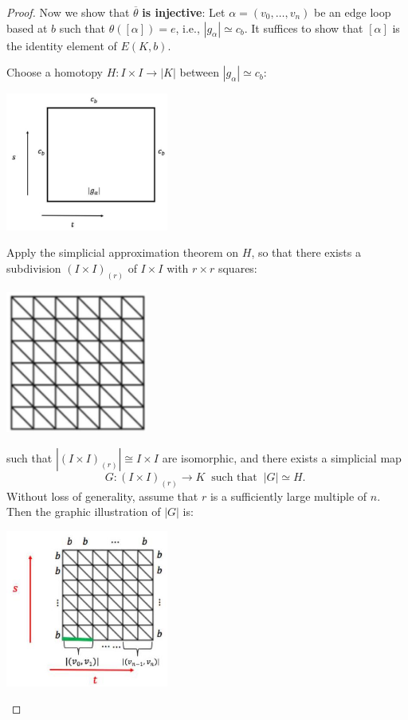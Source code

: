 \begin{proof}
Now we show that $\overline{\theta}$ {\bf is injective}: Let \(\alpha  = \left( {{v}_{0},\ldots,{v}_{n}}\right)\) be an edge loop based at \(b\) such that \(\theta \left( \left\lbrack  \alpha \right\rbrack  \right)  = e\), i.e., \(\left| {g}_{\alpha }\right|  \simeq  {c}_{b}\). It suffices to show that \(\left\lbrack  \alpha \right\rbrack\) is the identity element of \(E\left( {K,b}\right)\).

Choose a homotopy \(H: I \times  I \rightarrow  \left| K\right|\) 
between \(\left| {g}_{\alpha }\right|  \simeq  {c}_{b}\):
\begin{center}
\includegraphics[width=0.4\textwidth]{images/Ch8_g_alpha_cb.jpg}
\end{center}
\hspace*{3em} 
Apply the simplicial approximation theorem on $H$, so that there exists a subdivision \({\left( I \times  I\right) }_{\left( r\right) }\) of \(I \times  I\) with $r \times r$ squares:
\begin{center}
\includegraphics[width=0.35\textwidth]{images/Ch8_Irr.jpg}
\end{center}
such that \(\left| {\left( I \times  I\right) }_{\left( r\right) }\right|  \cong I \times  I\) are isomorphic, and there exists a simplicial map
\[
G:{\left( I \times  I\right) }_{\left( r\right) } \rightarrow  K
\ \text{  such that }\ \left| G\right|  \simeq  H\text{. }
\]
Without loss of generality, assume that \(r\) is a sufficiently large multiple of \(n\). Then the graphic illustration of \(\left| G\right|\) is:
\begin{center}
\includegraphics[width=0.4\textwidth]{images/Ch8_bar_G.jpg}

\end{center}
\end{proof}
